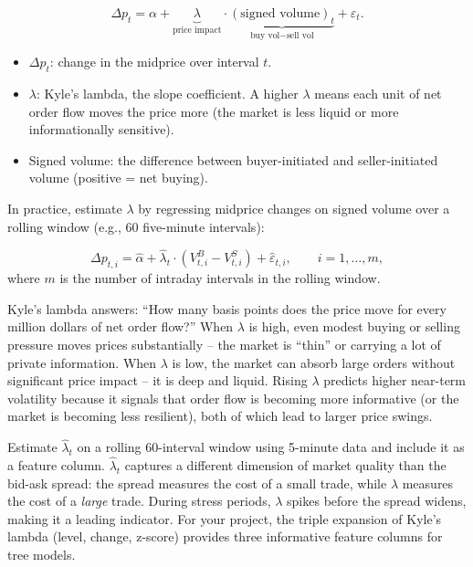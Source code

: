 \begin{equation}\label{eq:kyle-lambda}
\Delta p_t = \alpha + \underbrace{\lambda}_{\text{price impact}} \cdot \underbrace{(\text{signed volume})_t}_{\text{buy vol} - \text{sell vol}} + \varepsilon_t.
\end{equation}
\begin{itemize}[nosep]
  \item $\Delta p_t$: change in the midprice over interval $t$.
  \item $\lambda$: Kyle's lambda, the slope coefficient.  A higher $\lambda$ means each unit of net order flow moves the price more (the market is less liquid or more informationally sensitive).
  \item Signed volume: the difference between buyer-initiated and seller-initiated volume (positive = net buying).
\end{itemize}

In practice, estimate $\lambda$ by regressing midprice changes on signed volume over a rolling window (e.g., 60 five-minute intervals):

\begin{equation}\label{eq:kyle-regression}
\Delta p_{t,i} = \hat{\alpha} + \hat{\lambda}_t \cdot (V_{t,i}^B - V_{t,i}^S) + \hat{\varepsilon}_{t,i}, \qquad i = 1, \ldots, m,
\end{equation}
where $m$ is the number of intraday intervals in the rolling window.

\begin{intuition}
Kyle's lambda answers: ``How many basis points does the price move for every million dollars of net order flow?''
When $\lambda$ is high, even modest buying or selling pressure moves prices substantially -- the market is ``thin'' or carrying a lot of private information.
When $\lambda$ is low, the market can absorb large orders without significant price impact -- it is deep and liquid.
Rising $\lambda$ predicts higher near-term volatility because it signals that order flow is becoming more informative (or the market is becoming less resilient), both of which lead to larger price swings.
\end{intuition}

\begin{projectconnection}
Estimate $\hat{\lambda}_t$ on a rolling 60-interval window using 5-minute data and include it as a feature column.
$\hat{\lambda}_t$ captures a different dimension of market quality than the bid-ask spread: the spread measures the cost of a small trade, while $\lambda$ measures the cost of a \emph{large} trade.
During stress periods, $\lambda$ spikes before the spread widens, making it a leading indicator.
For your project, the triple expansion of Kyle's lambda (level, change, z-score) provides three informative feature columns for tree models.
\end{projectconnection}

